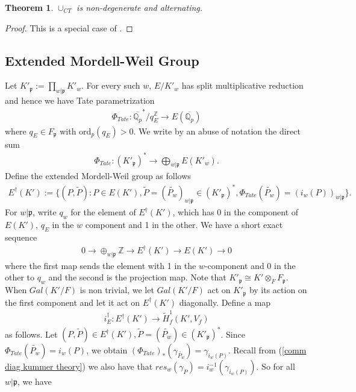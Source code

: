 \documentclass[reqno,10pt]{amsart}
\newcommand{\qp}{\mathbb{Q}_{p}}
\newcommand{\z}{\mathbb{Z}}
\newcommand{\p}{\mathfrak{p}}
\theoremstyle{plain}
\newtheorem{thm}{Theorem}[section]
\theoremstyle{definition}
\begin{document}
\begin{thm} \label{cup is alternating}
    $\cup_{CT}$ is non-degenerate and alternating.
\end{thm}
\begin{proof}
    This is a special case of \cite[Proposition 12.7.13.4]{Nekovar}.
\end{proof}

\subsection{Extended Mordell-Weil Group} 
Let $K'_\p := \prod_{w|\p} K'_w$. For every such $w$, $E/K'_w$ has split multiplicative reduction and hence we have Tate parametrization
\begin{align*}
    \Phi_{Tate} : \overline{\qp}^*/q_E^\z \rightarrow E(\overline{\qp})
\end{align*}
where $q_E \in F_\mathfrak{p}$ with $\mathrm{ord}_p(q_E)>0$. We write by an abuse of notation the direct sum
\begin{align*}
    \Phi_{Tate} : (K'_\mathfrak{p})^* \rightarrow \bigoplus_{w|\p} E(K'_w).
\end{align*}
Define the extended Mordell-Weil group as follows
\begin{align*}
    E^\dagger(K') := \{(P,\widetilde{P}) : P \in E(K'), \widetilde{P} = (\widetilde{P_w})_{w|\p} \in (K'_\mathfrak{p})^*, \Phi_{Tate}(\widetilde{P_w}) = (i_w(P))_{w|\p} \}.
\end{align*}
For $w|\p$, write $q_w$ for the element of $E^\dagger(K')$, which has 0 in the component of $E(K')$, $q_E$ in the $w$ component and 1 in the other. We have a short exact sequence
\begin{align*}
    0 \rightarrow \oplus_{w|\p} \z \rightarrow E^\dagger(K') \rightarrow E(K') \rightarrow 0
\end{align*}
where the first map sends the element with 1 in the $w$-component and 0 in the other to $q_w$ and the second is the projection map. Note that $K'_\p \cong K' \otimes_F F_\p$. When $Gal(K'/F)$ is non trivial, we let $Gal(K'/F)$ act on $K'_\p$ by its action on the first component and let it act on $E^\dagger(K')$ diagonally. Define a map 
\begin{align} \label{defn of iedagger}
    i_E^\dagger : E^\dagger(K') \rightarrow \widetilde{H}^1_f(K',V_f)
\end{align}
as follows. Let $(P,\widetilde{P}) \in E^\dagger(K'), \widetilde{P} = (\widetilde{P_w}) \in (K'_\mathfrak{p})^*$. Since $\Phi_{Tate}(\widetilde{P_w}) = i_w(P)$, we obtain $(\Phi_{Tate})_*(\gamma_{\widetilde{P_w}}) = \gamma_{i_w(P)}$. Recall from (\ref{comm diag kummer theory}) we also have that $res_w(\gamma_P) = i_w^{-1}(\gamma_{i_w(P)})$. So for all $w|\p$, we have 
\end{document}
